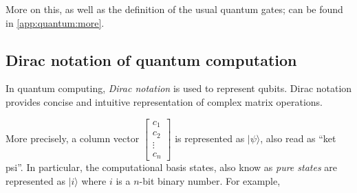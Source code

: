 \documentclass[11pt]{article}
\newcommand{\ket}[1]{|#1\rangle}
\begin{document}
\noindent More on this, as well as the definition of the usual quantum gates; can be found in \autoref{app:quantum:more}.

\subsection {Dirac notation of quantum computation}
In quantum computing, \emph{Dirac notation} is used to represent qubits. Dirac notation provides concise and intuitive representation of complex matrix operations.

More precisely, a column vector $\left[ \begin {array} {c} c_1\\ c_2\\ \vdots\\ c_n \end{array} \right]$ is represented as $\ket{\psi}$, also read as ``ket psi''.  In particular, the computational basis states, also know as \emph{pure states} are represented as $\ket{i}$  where  $i$ is a $n$-bit binary number. For example,
\end{document}
